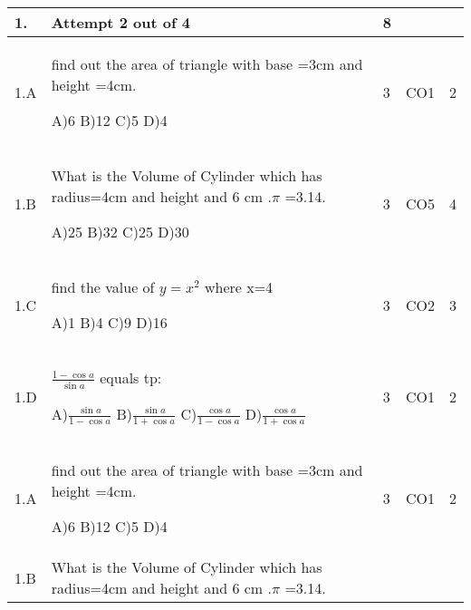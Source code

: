 \documentclass[12pt]{article}
\begin{document}
\begin{center}
\begin{longtable}{|L{1cm}|L{8cm}|C{1cm}|C{1cm}|C{1cm}|}
	\hline
	\bf{1}. & \bf{Attempt} \bf2 \bf{out} of \bf4 & \bf8  & & \\ \hline
	1.A & find out the area of triangle with base =3cm and height =4cm. \newline
	
	A)6\newline
	B)12\newline
	C)5\newline
	D)4 &
	3 &
	CO1&
	2 \\ \hline
	
	1.B & What is the Volume of Cylinder which has radius=4cm and height and 6 cm .$\pi$ =3.14. \newline
	
	A)25\newline
	B)32\newline
	C)25\newline
	D)30 &
	3 &
	CO5&
	4 \\ \hline
	
	1.C & find the value of   $y=x^{2}$  where x=4 \newline
	
	A)1\newline
	B)4\newline
	C)9\newline
	D)16 &
	3 &
	CO2&
	3 \\ \hline
	
	1.D & $\frac{1-\cos a}{\sin a}$  equals tp: \newline
	
	A)$\frac{\sin a}{1-\cos a}$\newline
	B)$\frac{\sin a}{1+\cos a}$\newline
	C)$\frac{\cos a}{1-\cos a}$\newline
	D)$\frac{\cos a}{1+\cos a}$ &
	3 &
	CO1&
	2 \\ \hline
		1.A & find out the area of triangle with base =3cm and height =4cm. \newline
	
	A)6\newline
	B)12\newline
	C)5\newline
	D)4 &
	3 &
	CO1&
	2 \\ \hline
	
	1.B & What is the Volume of Cylinder which has radius=4cm and height and 6 cm .$\pi$ =3.14. \newline
	

\end{longtable}
\end{center}
\end{document}
